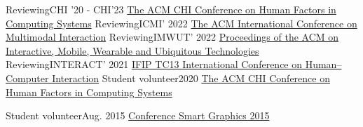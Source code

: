 
\resumeSubHeadingListStartNoLabel
\resumeSubheading
{Reviewing}{CHI '20 - CHI'23}
{\href{https://sigchi.org/}{The ACM CHI Conference on Human Factors in Computing Systems}}{}
\resumeSubheading
{Reviewing}{ICMI' 2022}
{\href{https://icmi.acm.org/2022/}{The ACM International Conference on Multimodal Interaction}}{}
\resumeSubheading
{Reviewing}{IMWUT' 2022}
{\href{https://dl.acm.org/journal/imwut}{Proceedings of the ACM on Interactive, Mobile, Wearable and Ubiquitous Technologies}}{}
\resumeSubheading
{Reviewing}{INTERACT' 2021}
{\href{https://www.interact2021.org/}{IFIP TC13 International Conference on Human–Computer Interaction}}{}
\resumeSubheading
{Student volunteer}{2020}
{\href{https://sigchi.org/}{The ACM CHI Conference on Human Factors in Computing Systems}}{}

\resumeSubheading
{Student volunteer}{Aug. 2015}
{\href{http://www.smartgraphics.org/sg15/}{Conference Smart Graphics 2015}}{}



\resumeSubHeadingListEnd